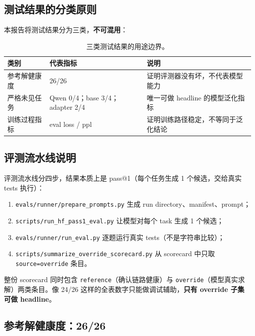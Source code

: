 \documentclass[11pt,a4paper]{article}
\newcommand{\code}[1]{\begingroup\ttfamily\footnotesize\nolinkurl{#1}\endgroup}
\begin{document}
\subsection{测试结果的分类原则}

本报告将测试结果分为三类，\textbf{不可混用}：

\begin{table}[htbp]
\centering
\small
\begin{tabularx}{\textwidth}{p{2.5cm} p{2.5cm} Y}
\toprule
类别 & 代表指标 & 说明 \\
\midrule
参考解健康度 & 26/26 & 证明评测器没有坏，不代表模型能力 \\
严格未见任务 & Qwen 0/4；base 3/4；adapter 2/4 & 唯一可做 headline 的模型泛化指标 \\
训练过程指标 & eval loss / ppl & 证明训练路径稳定，不等同于泛化结论 \\
\bottomrule
\end{tabularx}
\caption{三类测试结果的用途边界。}
\label{tab:test-categories}
\end{table}

\subsection{评测流水线说明}

评测流水线分四步，结果本质上是 pass@1（每个任务生成 1 个候选，交给真实 tests 执行）：

\begin{enumerate}
  \item \code{evals/runner/prepare\_prompts.py} 生成 run directory、manifest、prompt；
  \item \code{scripts/run\_hf\_pass1\_eval.py} 让模型对每个 task 生成 1 个候选；
  \item \code{evals/runner/run\_eval.py} 逐题运行真实 tests（不是字符串比较）；
  \item \code{scripts/summarize\_override\_scorecard.py} 从 scorecard 中只取 \code{source=override} 条目。
\end{enumerate}

\noindent 整份 scorecard 同时包含 \code{reference}（确认链路健康）与 \code{override}（模型真实求解）两类条目。像 24/26 这样的全表数字只能做调试辅助，\textbf{只有 override 子集可做 headline}。

\subsection{参考解健康度：26/26}
\end{document}
